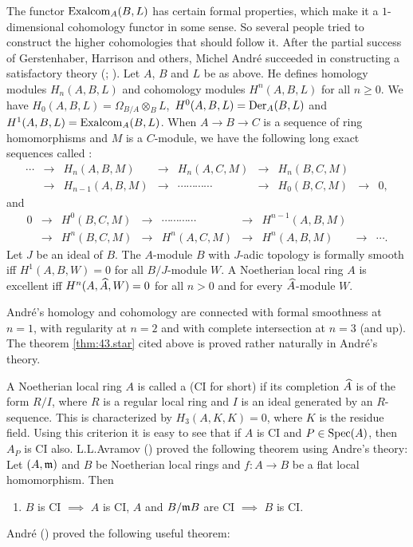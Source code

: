 \documentclass[../main]{subfiles}
\begin{document}
The functor $\operatorname{Exalcom}_A(B, L)$ has certain formal properties, which make it a $1$-dimensional cohomology functor in some sense. So several people tried to construct the higher cohomologies that should follow it. After the partial success of Gerstenhaber, Harrison and others, Michel André succeeded in constructing a satisfactory theory (\cite{andre1967methode}; \cite{andré1974homologie}). Let $A$, $B$ and $L$ be as above. He defines homology modules $H_n(A, B, L)$ and cohomology modules $H^n(A, B, L)$ for all $n \geqslant 0$. We have $H_0(A, B, L)=\Omega_{B / A} \otimes_B L$, $\, H^0(A, B, L)=\operatorname{Der}_A(B, L)$ and $H^1(A, B, L)=\operatorname{Exalcom}_A(B, L)$. When $A\longrightarrow B\longrightarrow C$ is a sequence of ring homomorphisms and $M$ is a $C$-module, we have the following long exact sequences called :
\[\begin{aligned}
\cdots&\longrightarrow& H_n(A,B,M)&\longrightarrow& H_n(A,C,M)&\longrightarrow& H_n(B,C,M)&\\ &\longrightarrow& H_{n-1}(A,B,M)&\longrightarrow&\cdots\cdots\cdots\cdots&\longrightarrow& H_0(B,C,M)&\longrightarrow& 0,\end{aligned}\]
and
\[\begin{aligned}0&\longrightarrow& H^0(B,C,M)&\longrightarrow&\cdots\cdots\cdots\cdots&\longrightarrow& H^{n-1}(A,B,M) &\\ &\longrightarrow &H^n(B,C,M)&\longrightarrow &H^n(A,C,M)&\longrightarrow& H^n(A,B,M)&\longrightarrow&\cdots.\end{aligned}\]
Let $J$ be an ideal of $B$. The $A$-module $B$ with $J$-adic topology is formally smooth iff $H^1(A, B, W)=0$ for all $B / J$-module $W$. A Noetherian local ring $A$ is excellent iff $H^n(A, \widehat{A}, W)=0$ for all $n>0$ and for every $\widehat{A}$-module $W$.

André's homology and cohomology are connected with formal smoothness at $n=1$, with regularity at $n=2$ and with complete intersection at $n=3$ (and up). The theorem \ref{thm:43.star} cited above is proved rather naturally in André's theory.

A Noetherian local ring $A$ is called a  (CI for short) if its completion $\widehat{A}$ is of the form $R / I$, where $R$ is a regular local ring and $I$ is an ideal generated by an $R$-sequence. This is characterized by $H_3(A, K, K)=0$, where $K$ is the residue field. Using this criterion it is easy to see that if $A$ is CI and $P \in\operatorname{Spec}(A)$, then $A_P$ is CI also. L.L.Avramov (\cite{avramov1975flat}) proved the following theorem using Andre's theory: Let $(A, \mathfrak{m})$ and $B$ be Noetherian local rings and $f: A\longrightarrow B$ be a flat local homomorphism. Then
\begin{enumerate}[label=$(\dagger)$]
    \item\label{thm:43.dagger} $B$ is CI $\implies$ $A$ is CI, $A$ and $B/\mathfrak{m}B$ are CI $\implies$ $B$ is CI.
\end{enumerate}
André (\cite{andre1974localisation}) proved the following useful theorem:
\end{document}

